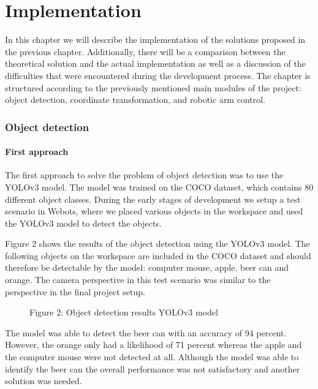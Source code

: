 
\chapter{Implementation} %

\label{implementation} %


In this chapter we will describe the implementation of the solutions proposed in the previous chapter. Additionally, there will be a comparison between the theoretical solution and the actual implementation as well as a discussion of the difficulties that were encountered during the development process. The chapter is structured according to the previously mentioned main modules of the project: object detection, coordinate transformation, and robotic arm control.
\subsection{Object detection}

\subsubsection{First approach}
The first approach to solve the problem of object detection was to use the YOLOv3 model. The model was trained on the COCO dataset, which contains 80 different object classes. During the early stages of development we setup a test scenario in Webots, where we placed various objects in the workspace and used the YOLOv3 model to detect the objects. 

Figure 2 shows the results of the object detection using the YOLOv3 model. The following objects on the workspace are included in the COCO dataset and should therefore be detectable by the model: computer mouse, apple, beer can and orange. The camera perspective in this test scenario was similar to the perspective in the final project setup.  

\begin{figure}[!h]
    \centering
    \caption{Figure 2: Object detection results YOLOv3 model }
\end{figure}


The model was able to detect the beer can with an accuracy of 94 percent. However, the orange only had a likelihood of 71 percent whereas the apple and the computer mouse were not detected at all. Although the model was able to identify the beer can the overall performance was not satisfactory and another solution was needed.

